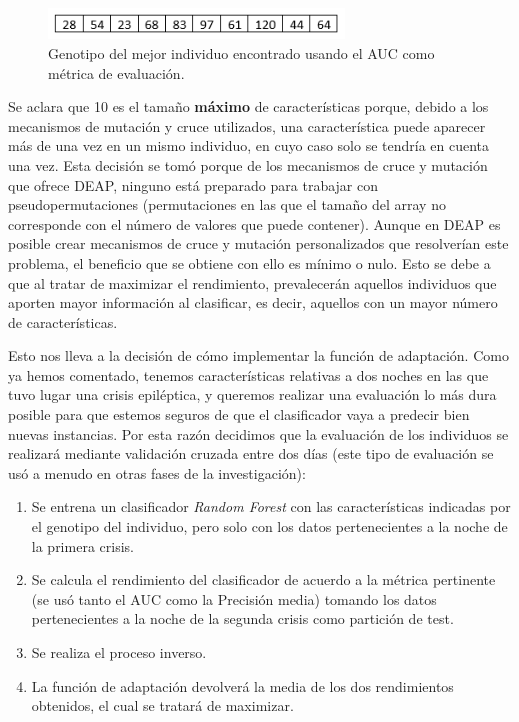 \begin{figure}[H]
	\centering
	\includegraphics[width=0.7\textwidth]{../img/genotipo.png}
	\caption{Genotipo del mejor individuo encontrado usando el AUC como métrica de evaluación.}
	\label{fig:genotipo}
\end{figure}

Se aclara que 10 es el tamaño \textbf{máximo} de características porque, debido a los mecanismos de mutación y cruce utilizados, una característica puede aparecer más de una vez en un mismo individuo, en cuyo caso solo se tendría en cuenta una vez. Esta decisión se tomó porque de los mecanismos de cruce y mutación que ofrece DEAP, ninguno está preparado para trabajar con pseudopermutaciones (permutaciones en las que el tamaño del array no corresponde con el número de valores que puede contener). Aunque en DEAP es posible crear mecanismos de cruce y mutación personalizados que resolverían este problema, el beneficio que se obtiene con ello es mínimo o nulo. Esto se debe a que al tratar de maximizar el rendimiento, prevalecerán aquellos individuos que aporten mayor información al clasificar, es decir, aquellos con un mayor número de características.

Esto nos lleva a la decisión de cómo implementar la función de adaptación. Como ya hemos comentado, tenemos características relativas a dos noches en las que tuvo lugar una crisis epiléptica, y queremos realizar una evaluación lo más dura posible para que estemos seguros de que el clasificador vaya a predecir bien nuevas instancias. Por esta razón decidimos que la evaluación de los individuos se realizará mediante validación cruzada entre dos días (este tipo de evaluación se usó a menudo en otras fases de la investigación): 

\begin{minipage}{\linewidth}
\begin{enumerate}
	\item Se entrena un clasificador \textit{Random Forest} con las características indicadas por el genotipo del individuo, pero solo con los datos pertenecientes a la noche de la primera crisis. 
	\item Se calcula el rendimiento del clasificador de acuerdo a la métrica pertinente (se usó tanto el AUC como la Precisión media) tomando los datos pertenecientes a la noche de la segunda crisis como partición de test. 
	\item Se realiza el proceso inverso. 
	\item La función de adaptación devolverá la media de los dos rendimientos obtenidos, el cual se tratará de maximizar. 
\end{enumerate}
\end{minipage}

